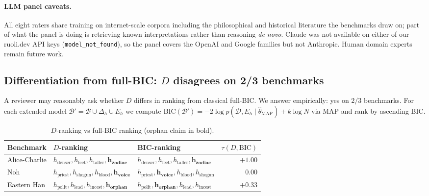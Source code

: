 \documentclass{article}
\begin{document}
\paragraph{LLM panel caveats.} All eight raters share training on
internet-scale corpora including the philosophical and historical
literature the benchmarks draw on; part of what the panel is doing
is retrieving known interpretations rather than reasoning
\emph{de novo}. Claude was not available on either of our
ruoli.dev API keys (\texttt{model\_not\_found}), so the panel covers
the OpenAI and Google families but not Anthropic. Human domain
experts remain future work.

\subsection{Differentiation from full-BIC: $D$ disagrees on 2/3 benchmarks}
\label{sec:bic-baseline}

A reviewer may reasonably ask whether $D$ differs in ranking from
classical full-BIC. We answer empirically: yes on $2/3$ benchmarks.
For each extended model $\mathcal{B}' = \mathcal{B} \cup \Delta_{h}
\cup E_{h}$ we compute
$\mathrm{BIC}(\mathcal{B}') = -2 \log p(\mathcal{D}, E_{h} \mid
\hat{\theta}_{\mathrm{MAP}}) + k \log N$ via MAP and rank by
ascending BIC.

\begin{table}[h]
\centering
\caption{$D$-ranking vs full-BIC ranking (orphan claim in bold).}
\label{tab:baseline}
\small
\begin{tabular}{l l l r}
\toprule
Benchmark & $D$-ranking & BIC-ranking & $\tau(D, \mathrm{BIC})$ \\
\midrule
Alice-Charlie & $h_{\text{denser}}, h_{\text{feet}}, h_{\text{taller}}, \mathbf{h_{\text{zodiac}}}$ &
                $h_{\text{denser}}, h_{\text{feet}}, h_{\text{taller}}, \mathbf{h_{\text{zodiac}}}$ & $+1.00$ \\
Noh           & $h_{\text{priest}}, h_{\text{shogun}}, h_{\text{blood}}, \mathbf{h_{\text{voice}}}$ &
                $h_{\text{priest}}, \mathbf{h_{\text{voice}}}, h_{\text{blood}}, h_{\text{shogun}}$ & $\phantom{+}0.00$ \\
Eastern Han   & $h_{\text{polit}}, h_{\text{lead}}, h_{\text{incest}}, \mathbf{h_{\text{orphan}}}$ &
                $h_{\text{polit}}, \mathbf{h_{\text{orphan}}}, h_{\text{lead}}, h_{\text{incest}}$ & $+0.33$ \\
\bottomrule
\end{tabular}
\end{table}
\end{document}
